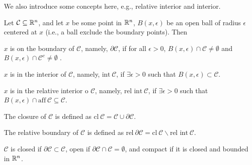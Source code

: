 We also introduce some concepts here, e.g., relative interior and interior.

Let $\mathcal{C}\subseteq \mathbb{R}^n$, and let $x$ be some point in $\mathbb{R}^n$, $B(x, \epsilon)$ be an open ball of radius $\epsilon$ centered at $x$ (i.e., a ball exclude the boundary points). Then

\begin{definition}
$x$ is on the boundary of $\mathcal{C}$, namely, $\partial\mathcal{C}$, if for all $\epsilon>0$, $B(x, \epsilon)\cap \mathcal{C} \neq \emptyset$ and $B(x, \epsilon)\cap \mathcal{C}^c \neq \emptyset$ .
\end{definition}

\begin{definition}
	$x$ is in the interior of $\mathcal{C}$, namely, $\text{int}\ \mathcal{C}$, if $\exists \epsilon>0$ such that $B(x, \epsilon)\subset \mathcal{C}$.
\end{definition}

\begin{definition}
	$x$ is in the relative interior o $\mathcal{C}$, namely, $\text{rel int}\ \mathcal{C}$, if $\exists \epsilon>0$ such that $B(x, \epsilon)\cap \text{aff}\ \mathcal{C} \subseteq \mathcal{C}$.
\end{definition}

\begin{definition}
	The closure of $\mathcal{C}$ is defined as $\text{cl}\ \mathcal{C} = \mathcal{C} \cup \partial\mathcal{C}$.
\end{definition}

\begin{definition}
	The relative boundary of $\mathcal{C}$ is defined as $\text{rel}\ \partial\mathcal{C} = \text{cl}\  \mathcal{C}\backslash \text{rel int}\ \mathcal{C}$.
\end{definition}

\begin{definition}
	$\mathcal{C}$ is closed if $\partial\mathcal{C} \subset \mathcal{C}$, open if $\partial\mathcal{C} \cap \mathcal{C} =\emptyset$, and compact if it is closed and bounded in $\mathbb{R}^{n}$.
\end{definition}


